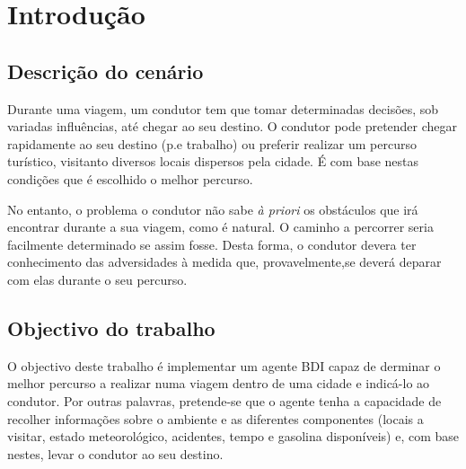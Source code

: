 \documentclass[15pt,a4paper]{article}
\begin{document}

\newpage

\tableofcontents



\newpage

\section{}

\section{Introdução}

\subsection{Descrição do cenário}
Durante uma viagem, um condutor tem que tomar determinadas decisões, sob variadas influências, até chegar ao seu destino. O condutor pode pretender chegar rapidamente ao seu destino (p.e trabalho) ou preferir realizar um percurso turístico, visitanto diversos locais dispersos pela cidade. É com base nestas condições que é escolhido o melhor percurso.

No entanto, o problema o condutor não sabe \textit{à priori} os obstáculos que irá encontrar durante a sua viagem, como é natural. O caminho a percorrer seria facilmente determinado se assim fosse. Desta forma, o condutor devera ter conhecimento das adversidades à medida que, provavelmente,se deverá deparar com elas durante o seu percurso.

\subsection{Objectivo do trabalho}

O objectivo deste trabalho é implementar um agente BDI capaz de derminar o melhor percurso a realizar numa viagem dentro de uma cidade e indicá-lo ao condutor. Por outras palavras, pretende-se que o agente tenha a capacidade de recolher informações sobre o ambiente e as diferentes componentes (locais a visitar, estado meteorológico, acidentes, tempo e gasolina disponíveis) e, com base nestes, levar o condutor ao seu destino.
\end{document}
